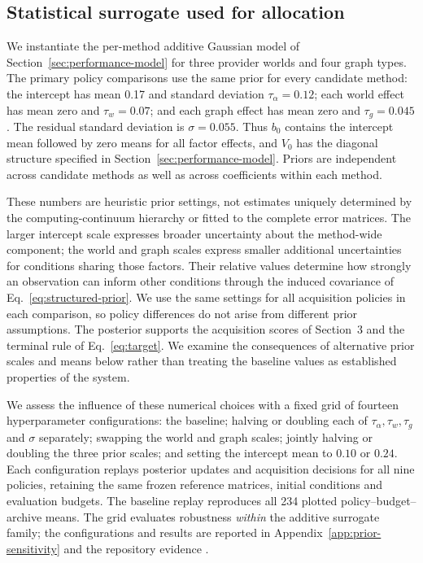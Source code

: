 \documentclass[10pt,a4paper]{article}
\begin{document}
\subsection{Statistical surrogate used for allocation}
\label{sec:surrogate-case}
We instantiate the per-method additive Gaussian model of
Section~\ref{sec:performance-model} for three provider worlds
and four graph types. The primary policy comparisons use the
same prior for every candidate method: the intercept has mean
0.17 and standard deviation $\tau_\alpha=0.12$; each world
effect has mean zero and $\tau_w=0.07$; and each graph effect
has mean zero and $\tau_g=0.045$. The residual standard
deviation is $\sigma=0.055$. Thus $b_0$ contains the intercept
mean followed by zero means for all factor effects, and $V_0$
has the diagonal structure specified in
Section~\ref{sec:performance-model}. Priors are independent
across candidate methods as well as across coefficients
within each method.

These numbers are heuristic prior settings, not estimates uniquely determined by the computing-continuum hierarchy or fitted to the complete error matrices. The larger intercept scale expresses broader uncertainty about the method-wide component; the world and graph scales express smaller additional uncertainties for conditions sharing those factors. Their relative values determine how strongly an observation can inform other conditions through the induced covariance of Eq.~\eqref{eq:structured-prior}. We use the same settings for all acquisition policies in each comparison, so policy differences do not arise from different prior assumptions. The posterior supports the acquisition scores of Section~3 and the terminal rule of Eq.~\eqref{eq:target}. We examine the consequences of alternative prior scales and means below rather than treating the baseline values as established properties of the system.

We assess the influence of these numerical choices with a fixed grid of fourteen hyperparameter configurations: the baseline; halving or doubling each of $\tau_\alpha,\tau_w,\tau_g$ and $\sigma$ separately; swapping the world and graph scales; jointly halving or doubling the three prior scales; and setting the intercept mean to $0.10$ or $0.24$. Each configuration replays posterior updates and acquisition decisions for all nine policies, retaining the same frozen reference matrices, initial conditions and evaluation budgets. The baseline replay reproduces all 234 plotted policy--budget--archive means. The grid evaluates robustness \emph{within} the additive surrogate family; the configurations and results are reported in Appendix~\ref{app:prior-sensitivity} and the repository evidence \cite{praisePriorSensitivity}.
\end{document}
